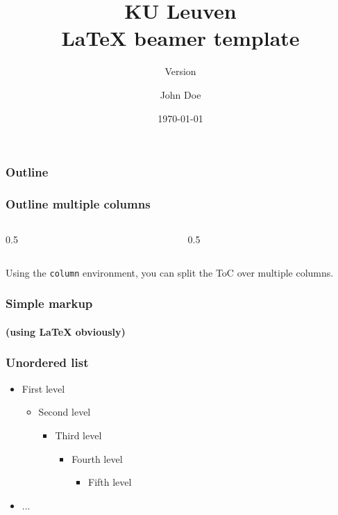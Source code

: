 \documentclass[t, xcolor=table, aspectratio=169]{beamer}
\title{KU Leuven\\\indent\LaTeX{} beamer template}
\subtitle{Version \KULversion}
\institute{KU Leuven,Faculty of Engineering Science}
\author{John Doe}
\date{\today}
\begin{document}
    \begin{frame}
        \titlepage
    \end{frame}

    \begin{frame}
        \frametitle{Outline}
        \tableofcontentsTOP %
    \end{frame}

    \begin{frame}
        \frametitle{Outline multiple columns}
        \vspace{1em}
        \begin{columns}[onlytextwidth,T]
            \begin{column}{0.5\textwidth}
                \tableofcontentsTOP[sections={1}]
            \end{column}
            \begin{column}{0.5\textwidth}
                \tableofcontentsTOP[sections={2-3}]
            \end{column}
        \end{columns}
        \vspace{1em}
        Using the \texttt{column} environment, you can split the ToC over multiple columns.
    \end{frame}

    \begin{frame}
        \frametitle{Simple markup}
        \framesubtitle{(using \LaTeX{} obviously)}
    \end{frame}

    \begin{frame}
        \frametitle{Unordered list}
        \begin{itemize}
            \item First level
            \begin{itemize}
                \item Second level
                \begin{itemize}
                    \item Third level
                    \begin{itemize}
                        \item Fourth level
                        \begin{itemize}
                            \item Fifth level
                        \end{itemize}
                    \end{itemize}
                \end{itemize}
            \end{itemize}
            \item ...
        \end{itemize}
    \end{frame}
\end{document}
